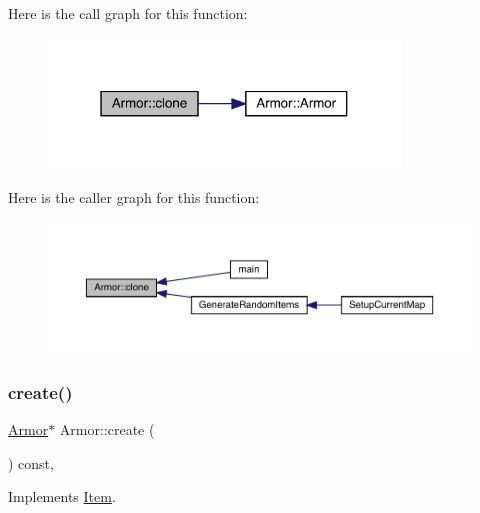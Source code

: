 Here is the call graph for this function\+:
\nopagebreak
\begin{figure}[H]
\begin{center}
\leavevmode
\includegraphics[width=265pt]{class_armor_aac8aec108de9a8a45bada1534c0f23b7_cgraph}
\end{center}
\end{figure}
Here is the caller graph for this function\+:
\nopagebreak
\begin{figure}[H]
\begin{center}
\leavevmode
\includegraphics[width=350pt]{class_armor_aac8aec108de9a8a45bada1534c0f23b7_icgraph}
\end{center}
\end{figure}
\mbox{\label{class_armor_a21de0acaa6ecdb6f5937166b83da9b01}} 
\subsubsection{\texorpdfstring{create()}{create()}}
{\footnotesize\ttfamily \mbox{\hyperlink{class_armor}{Armor}}$\ast$ Armor\+::create (\begin{DoxyParamCaption}{ }\end{DoxyParamCaption}) const\hspace{0.3cm}{\ttfamily [inline]}, {\ttfamily [virtual]}}



Implements \mbox{\hyperlink{class_item_a17b3fa0cef44ada961e0d3c65e1de864}{Item}}.

